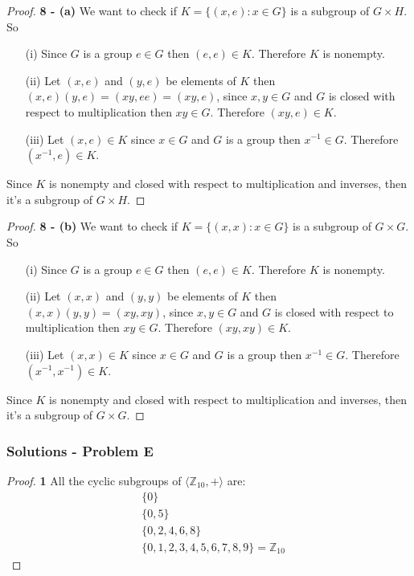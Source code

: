 \documentclass[11pt]{article}
\begin{document}
\cleardoublepage
	\begin{proof}{\textbf{8 - (a)}}
		We want to check if $K=\{(x,e): x \in G\}$ is a subgroup of $G \times H$. So
		\begin{itemize}
			\item[(i)] Since $G$ is a group $e \in G$ then $(e,e) \in K$. Therefore $K$ is nonempty.
			\item[(ii)] Let $(x,e)$ and $(y,e)$ be elements of $K$ then $(x,e)(y,e)=(xy,ee)=(xy,e)$, since $x,y \in G$ and $G$ is closed with respect to multiplication then $xy \in G$. Therefore $(xy,e) \in K$.
			\item[(iii)] Let $(x,e) \in K$ since $x \in G$ and $G$ is a group then $x^{-1} \in G$. Therefore $(x^{-1},e) \in K$.
		\end{itemize}
	Since $K$ is nonempty and closed with respect to multiplication and inverses, then it's a subgroup of $G \times H$.
	\end{proof}
	\begin{proof}{\textbf{8 - (b)}}
		We want to check if $K=\{(x,x): x \in G\}$ is a subgroup of $G \times G$. So
		\begin{itemize}
			\item[(i)] Since $G$ is a group $e \in G$ then $(e,e) \in K$. Therefore $K$ is nonempty.
			\item[(ii)] Let $(x,x)$ and $(y,y)$ be elements of $K$ then $(x,x)(y,y)=(xy,xy)$, since $x,y \in G$ and $G$ is closed with respect to multiplication then $xy \in G$. Therefore $(xy,xy) \in K$.
			\item[(iii)] Let $(x,x) \in K$ since $x \in G$ and $G$ is a group then $x^{-1} \in G$. Therefore $(x^{-1},x^{-1}) \in K$.
		\end{itemize}
	Since $K$ is nonempty and closed with respect to multiplication and inverses, then it's a subgroup of $G \times G$.
	\end{proof}

	\subsubsection*{Solutions - Problem E}
	\begin{proof}{\textbf{1}} All the cyclic subgroups of $\langle \mathbb{Z}_{10}, + \rangle$ are:
		\begin{align*}
			&\{0\}\\
			&\{0,5\}\\
			&\{0,2,4,6,8\}\\
			&\{0,1,2,3,4,5,6,7,8,9\}=\mathbb{Z}_{10} 
		\end{align*}
	\end{proof}
\end{document}
